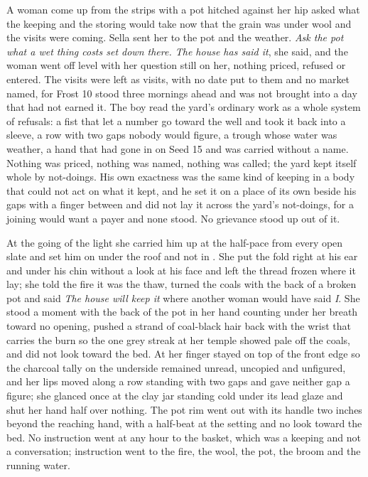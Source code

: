 A woman come up from the strips with a pot hitched against her hip asked what the keeping and the storing would take now that the grain was under wool and the visits were coming. Sella sent her to the pot and the weather. \emph{Ask the pot what a wet thing costs set down there. The house has said it}, she said, and the woman went off level with her question still on her, nothing priced, refused or entered. The visits were left as visits, with no date put to them and no market named, for Frost 10 stood three mornings ahead and was not brought into a day that had not earned it. The boy read the yard's ordinary work as a whole system of refusals: a fist that let a number go toward the well and took it back into a sleeve, a row with two gaps nobody would figure, a trough whose water was weather, a hand that had gone in on Seed 15 and was carried without a name. Nothing was priced, nothing was named, nothing was called; the yard kept itself whole by not-doings. His own exactness was the same kind of keeping in a body that could not act on what it kept, and he set it on a place of its own beside his gaps with a finger between and did not lay it across the yard's not-doings, for a joining would want a payer and none stood. No grievance stood up out of it.

At the going of the light she carried him up at the half-pace from every open slate and set him on  under the roof and not in . She put the fold right at his ear and under his chin without a look at his face and left the thread frozen where it lay; she told the fire it was the thaw, turned the coals with the back of a broken pot and said \emph{The house will keep it} where another woman would have said \emph{I}. She stood a moment with the back of the pot in her hand counting under her breath toward no opening, pushed a strand of coal-black hair back with the wrist that carries the burn so the one grey streak at her temple showed pale off the coals, and did not look toward the bed. At  her finger stayed on top of the front edge so the charcoal tally on the underside remained unread, uncopied and unfigured, and her lips moved along a row standing with two gaps and gave neither gap a figure; she glanced once at the clay jar standing cold under its lead glaze and shut her hand half over nothing. The pot rim went out with its handle two inches beyond the reaching hand, with a half-beat at the setting and no look toward the bed. No instruction went at any hour to the basket, which was a keeping and not a conversation; instruction went to the fire, the wool, the pot, the broom and the running water.

